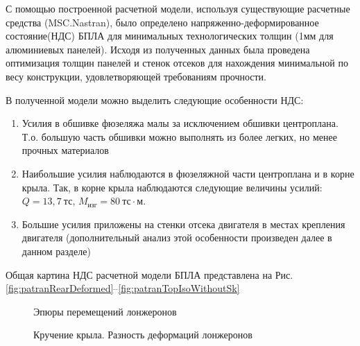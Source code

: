 
С помощью построенной расчетной модели, используя существующие расчетные средства (MSC.Nastran), было определено напряженно-деформированное состояние(НДС) БПЛА для минимальных технологических толщин (1мм для алюминиевых панелей). Исходя из полученных данных была проведена оптимизация толщин панелей и стенок отсеков для нахождения минимальной по весу конструкции, удовлетворяющей требованиям прочности.

В полученной модели можно выделить следующие особенности НДС:

\begin{enumerate}
\item Усилия в обшивке фюзеляжа малы за исключением обшивки центроплана. Т.о. большую часть обшивки можно выполнять из более легких, но менее прочных материалов
\item Наибольшие усилия наблюдаются в фюзеляжной части центроплана и в корне крыла. Так, в корне крыла наблюдаются следующие величины усилий: $Q = 13,7~\text{тс}$, $M_\text{изг} = 80~\text{тс}\cdot\text{м}$. 
\item Большие усилия приложены на стенки отсека двигателя в местах крепления двигателя (дополнительный анализ этой особенности произведен далее в данном разделе)
\end{enumerate}  

Общая картина НДС расчетной модели БПЛА представлена на Рис.\ref{fig:patranRearDeformed}--\ref{fig:patranTopIsoWithoutSk}


%



\begin{figure}[H]
\centering
\def\svgwidth{0.9\textwidth}

\caption{Эпюры перемещений лонжеронов}
\label{fig:WingDeformation3}
\end{figure}

\begin{figure}[H]
\centering
\def\svgwidth{0.9\textwidth}

\caption{Кручение крыла. Разность деформаций лонжеронов}
\label{fig:WingRotating}
\end{figure}



